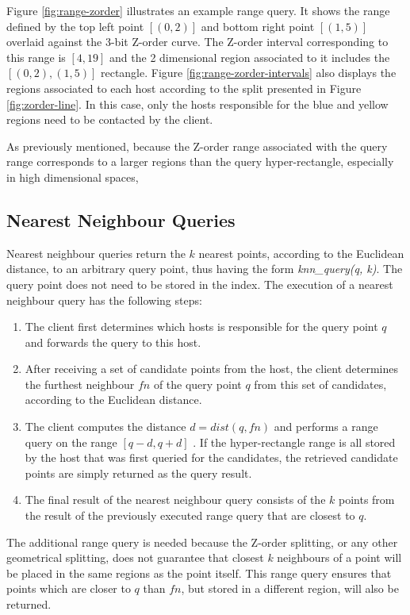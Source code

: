 \documentclass[11pt,a4paper]{globis-book}
\begin{document}
Figure \ref{fig:range-zorder} illustrates an example range query. It shows the range defined by the top left point $[(0, 2)]$ and bottom right point $[(1, 5)]$ overlaid against the 3-bit Z-order curve. The Z-order interval corresponding to this range is $[4, 19]$ and the 2 dimensional region associated to it includes the $[(0, 2), (1, 5)]$ rectangle. Figure \ref{fig:range-zorder-intervals} also displays the regions associated to each host according to the split presented in Figure \ref{fig:zorder-line}. In this case, only the hosts responsible for the blue and yellow regions need to be contacted by the client. 

As previously mentioned, because the Z-order range associated with the query range corresponds to a larger regions than the query hyper-rectangle, especially in high dimensional spaces, 

\subsection{Nearest Neighbour Queries}

Nearest neighbour queries return the $k$ nearest points, according to the Euclidean distance, to an arbitrary query point, thus having the form \textit{knn\_query(q, k)}. The query point does not need to be stored in the index. The execution of a nearest neighbour query has the following steps:
\begin{enumerate}
    \item The client first determines which hosts is responsible for the query point $q$ and forwards the query to this host.
    \item After receiving a set of candidate points from the host, the client determines the furthest neighbour $fn$ of the query point $q$ from this set of candidates, according to the Euclidean distance. 
    \item The client computes the distance $d = dist(q, fn)$ and performs a range query on the range $[q - d, q + d]$ . If the hyper-rectangle range is all stored by the host that was first queried for the candidates, the retrieved candidate points are simply returned as the query result.
    \item The final result of the nearest neighbour query consists of the $k$ points from the result of the previously executed range query that are closest to $q$.  
\end{enumerate}

The additional range query is needed because the Z-order splitting, or any other geometrical splitting, does not guarantee that closest $k$ neighbours of a point will be placed in the same regions as the point itself. This range query ensures that points which are closer to $q$ than $fn$, but stored in a different region, will also be returned. 
\end{document}
